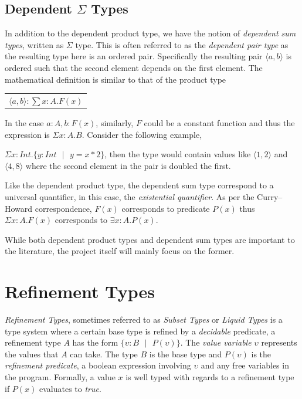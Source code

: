 \documentclass[a4paper,12pt]{report}
\begin{document}
\subsection{Dependent $\Sigma$ Types}
In addition to the dependent product type, we have the notion of \textit{dependent sum 
types}, written as $\Sigma$ type. This is often referred to as the 
\textit{dependent pair type} as the resulting type here is an ordered pair. 
Specifically the resulting pair $\langle a,b \rangle$ is ordered such that the 
second element depends on the first element. The 
mathematical definition is similar to that of the product type
\begin{center}
 \begin{tabular}{l}
   $\langle a,b \rangle :\sum x: A.  F(x)$
 \end{tabular} 
\end{center}
In the case $a:A, b: F(x)$, similarly, $F$ could be a constant function and thus 
the expression is $\Sigma x:A.B$. Consider the following example, 

$\Sigma x: Int.\{y:Int\text{ }|\text{ } y = x * 2\}$, then the type would 
contain values like $\langle 1,2 \rangle$ and $\langle 4,8 \rangle$ where the 
second element in the pair is doubled the first.

\par
Like the dependent product type, the dependent sum type correspond to a 
universal quantifier, in this case, the \textit{existential quantifier}. As 
per the Curry–Howard correspondence, $F(x)$ corresponds to predicate $P(x)$ 
thus $\Sigma x:A.F(x)$ corresponds to $\exists x: A. P(x)$.

\par
While both dependent product types and dependent sum types are important to the 
literature, the project itself will mainly focus on the former.

\section{Refinement Types}
\textit{Refinement Types}, sometimes referred to as \textit{Subset Types} 
\cite{subsetTypes} or \textit{Liquid Types} \cite{liquidTypes} 
is a type system where a certain base type is refined by a 
\textit{decidable} predicate, a refinement type $A$ has the form 
$\{\upsilon : B\text{ }|\text{ }P(\upsilon)\}$. The \textit{value variable} 
$\upsilon$ represents the values that $A$ can take. The type $B$ is the 
base type and $P(\upsilon)$ is the \textit{refinement predicate}, 
a boolean expression involving $\upsilon$ and any free variables in the program. 
Formally, a value $x$ is well typed with regards to a refinement type 
if $P(x)$ evaluates to \textit{true}.
\end{document}
